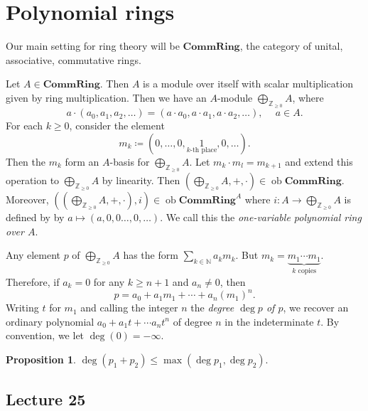 \documentclass[10pt,letterpaper,cm]{nupset}
\theoremstyle{definition}
\theoremstyle{theorem}
\newtheorem{prop}[definition]{Proposition}
\theoremstyle{remark}
\newcommand{\N}{\mathbb N}
\newcommand{\Z}{\mathbb Z}
\newcommand{\1}{\mathbf{1}}
\newcommand{\0}{\vec 0}
\DeclareMathOperator{\ob}{ob}
\begin{document}
\section{Polynomial rings}


Our main setting for ring theory will be $\mathbf{CommRing}$, the category of unital, associative, commutative rings.

\medskip

Let $A \in \mathbf{CommRing}$. Then $A$ is a module over itself with scalar multiplication given by ring multiplication. Then we have an $A$-module $\bigoplus_{\Z_{\geq 0}} A$, where 
\[
a\cdot \left(a_0, a_1, a_2, \ldots \right) = \left(a\cdot a_0, a\cdot a_1, a\cdot a_2, \ldots \right), \ \quad a \in A.
\] For each $k\geq 0$, consider the element $$m_k \coloneqq \left(0, \ldots, 0, \underset{\text{$k$-th place}}{1}, 0 , \ldots \right).$$ Then the $m_k$ form an $A$-basis for  $\bigoplus_{\Z_{\geq 0}} A$. Let $m_k \cdot m_l = m_{k+1}$ and extend this operation to $\bigoplus_{\Z_{\geq 0}} A$ by linearity. Then $\left(\bigoplus_{\Z_{\geq 0}} A, + , \cdot\right) \in  \ob{\mathbf{CommRing}}$. Moreover, $\left(\left(\bigoplus_{\Z_{\geq 0}} A, + , \cdot\right), i\right) \in  \ob{\mathbf{CommRing}^A}$ where $i : A \to \bigoplus_{\Z_{\geq 0}}A$ is defined by by $a \mapsto \left(a, 0, 0 \ldots, 0, \ldots\right)$. We call this the \textit{one-variable polynomial ring over $A$}.


Any element $p$ of $\bigoplus_{\Z_{\geq 0}} A$ has the form $\sum_{k\in \N}a_km_k$. But $m_k = \underbrace{m_1\cdots m_1}_{k \text{ copies}}$. Therefore, if $a_k =0$ for any $k\geq n+1$ and $a_n \ne 0$, then   $$p = a_0 + a_1m_1 + \cdots + a_n(m_1)^n.$$ Writing $t$ for $m_1$ and calling the integer $n$ the \textit{degree $\deg{p}$ of $p$}, we recover an ordinary polynomial $a_0 + a_1t + \cdots a_nt^n$ of degree $n$ in the indeterminate $t$. By convention, we let $\deg(0)= {-\infty}$.


\begin{prop}
$\deg(p_1 + p_2) \leq \max(\deg p_1, \deg p_2)$.
\end{prop}

\subsection{Lecture 25}
\end{document}

